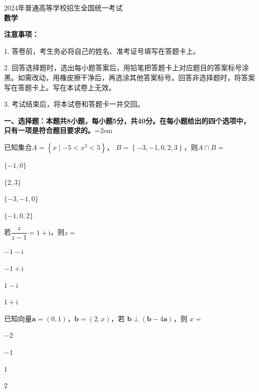 \documentclass[a4paper, 11pt]{article}
\renewcommand{\i}{\mathrm{i}}
\begin{document}
\begin{center}
	{\fontsize{17pt}{\baselineskip} \selectfont 2024年普通高等学校招生全国统一考试\\[9pt]
		
	\textbf{\fontsize{22pt}{\baselineskip}\selectfont 数\quad 学}}
\end{center}

\noindent\textbf{注意事项：}

1. 答卷前，考生务必将自己的姓名、准考证号填写在答题卡上。

2. 回答选择题时，选出每小题答案后，用铅笔把答题卡上对应题目的答案标号涂黑。如需改动，用橡皮擦干净后，再选涂其他答案标号。回答非选择题时，将答案写在答题卡上。写在本试卷上无效。

3. 考试结束后，将本试卷和答题卡一并交回。\vspace{6pt}

\noindent \textbf{一、选择题：本题共8小题，每小题5分，共40分。在每小题给出的四个选项中，只有一项是符合题目要求的。}\hangindent=2em

\begin{question}
	已知集合$A=\left\{x\mid-5<x^3<5\right\}$， $B=\left\{-3,-1,0,2,3\right\}$，则$A\cap B=$
	\begin{choices}
		\item $\{-1,0\}$
		\item $\{2,3\}$
		\item $\{-3,-1,0\}$
		\item $\{-1,0,2\}$
	\end{choices}
\end{question}

\begin{question}
	若$\dfrac{z}{z-1}=1+\i$，则$z=$
	\begin{choices}
		\item $-1-\i$
		\item $-1+\i$
		\item $1-\i$
		\item $1+\i$
	\end{choices}
\end{question}

\begin{question}
	已知向量$\boldsymbol a=(0,1)$，$\boldsymbol b=(2,x)$，若 $\boldsymbol b\perp (\boldsymbol b-4\boldsymbol a)$，则 $x=$
	\begin{choices}
		\item $-2$
		\item $-1$
		\item $1$
		\item $2$
	\end{choices}
\end{question}
\end{document}
